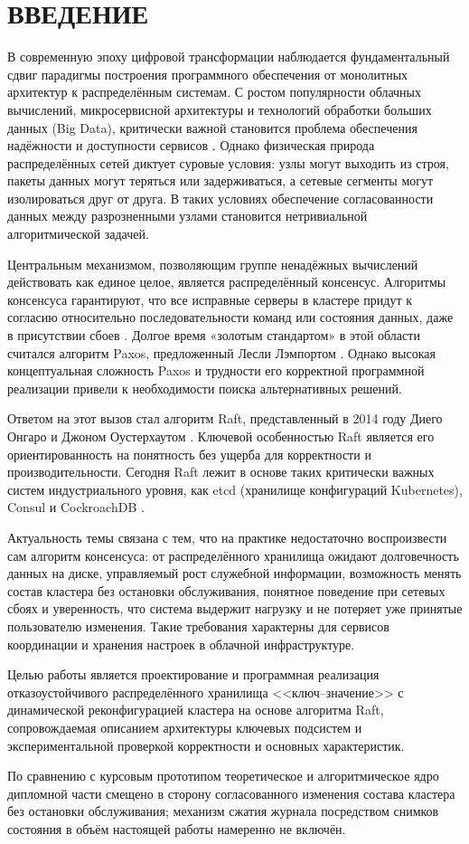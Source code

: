 \chapter*{\large ВВЕДЕНИЕ}

В современную эпоху цифровой трансформации наблюдается фундаментальный сдвиг парадигмы построения программного обеспечения от монолитных архитектур к распределённым системам. С ростом популярности облачных вычислений, микросервисной архитектуры и технологий обработки больших данных (Big Data), критически важной становится проблема обеспечения надёжности и доступности сервисов \cite{tanenbaum,kleppmann}. Однако физическая природа распределённых сетей диктует суровые условия: узлы могут выходить из строя, пакеты данных могут теряться или задерживаться, а сетевые сегменты могут изолироваться друг от друга. В таких условиях обеспечение согласованности данных между разрозненными узлами становится нетривиальной алгоритмической задачей.

Центральным механизмом, позволяющим группе ненадёжных вычислений действовать как единое целое, является распределённый консенсус. Алгоритмы консенсуса гарантируют, что все исправные серверы в кластере придут к согласию относительно последовательности команд или состояния данных, даже в присутствии сбоев \cite{lynch_book}. Долгое время «золотым стандартом» в этой области считался алгоритм Paxos, предложенный Лесли Лэмпортом \cite{paxos_simple}. Однако высокая концептуальная сложность Paxos и трудности его корректной программной реализации привели к необходимости поиска альтернативных решений.

Ответом на этот вызов стал алгоритм Raft, представленный в 2014 году Диего Онгаро и Джоном Оустерхаутом \cite{raft_original,raft_dissertation}. Ключевой особенностью Raft является его ориентированность на понятность без ущерба для корректности и производительности. Сегодня Raft лежит в основе таких критически важных систем индустриального уровня, как etcd (хранилище конфигураций Kubernetes), Consul и CockroachDB \cite{etcd_docs}.

Актуальность темы связана с тем, что на практике недостаточно воспроизвести сам алгоритм консенсуса: от распределённого хранилища ожидают долговечность данных на диске, управляемый рост служебной информации, возможность менять состав кластера без остановки обслуживания, понятное поведение при сетевых сбоях и уверенность, что система выдержит нагрузку и не потеряет уже принятые пользователю изменения. Такие требования характерны для сервисов координации и хранения настроек в облачной инфраструктуре.

Целью работы является проектирование и программная реализация отказоустойчивого распределённого хранилища <<ключ--значение>> с динамической реконфигурацией кластера на основе алгоритма Raft, сопровождаемая описанием архитектуры ключевых подсистем и экспериментальной проверкой корректности и основных характеристик.

По сравнению с курсовым прототипом теоретическое и алгоритмическое ядро дипломной части смещено в сторону согласованного изменения состава кластера без остановки обслуживания; механизм сжатия журнала посредством снимков состояния в объём настоящей работы намеренно не включён.